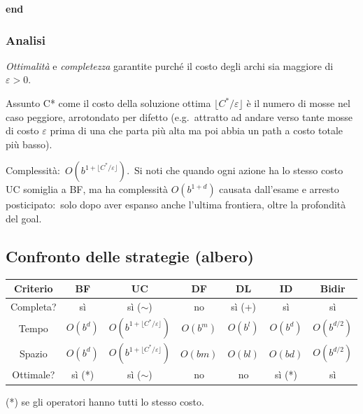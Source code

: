 \textbf{end}

\subsubsection{Analisi}

\textit{Ottimalità} e \textit{completezza} garantite purché il costo degli archi sia maggiore di $\varepsilon > 0$.

Assunto C* come il costo della soluzione ottima $\lfloor C^*/\varepsilon\rfloor$ è il numero di mosse nel caso peggiore, arrotondato per difetto (e.g.\ attratto ad andare verso tante mosse di costo $\varepsilon$ prima di una che parta più alta ma poi abbia un path a costo totale più basso).\

Complessità:\ $O(b^{1+\lfloor C^*/\varepsilon\rfloor})$.\
Si noti che quando ogni azione ha lo stesso costo UC somiglia a BF, ma ha complessità $O(b^{1+d})$ causata dall'esame e arresto posticipato:\ solo dopo aver espanso anche l’ultima frontiera, oltre la profondità del goal.

\subsection{Confronto delle strategie (albero)}

\begin{table}[H]
	\centering
	\begin{tabular}{|c|c|c|c|c|c|c|}
		\hline
		\textbf{Criterio} & \textbf{BF} & \textbf{UC}                               & \textbf{DF} & \textbf{DL} & \textbf{ID} & \textbf{Bidir} \\\hline
		Completa?         & sì          & sì ($\sim$)                               & no          & sì (+)      & sì          & sì             \\
		Tempo             & $O(b^d)$    & $O(b^{1+\lfloor C^*/\varepsilon\rfloor})$ & $O(b^m)$    & $O(b^l)$    & $O(b^d)$    & $O(b^{d/2})$   \\
		Spazio            & $O(b^d)$    & $O(b^{1+\lfloor C^*/\varepsilon\rfloor})$ & $O(bm)$     & $O(bl)$     & $O(bd)$     & $O(b^{d/2})$   \\
		Ottimale?         & sì (*)      & sì ($\sim$)                               & no          & no          & sì (*)      & sì             \\\hline
	\end{tabular}
\end{table}

\noindent(*) se gli operatori hanno tutti lo stesso costo.

